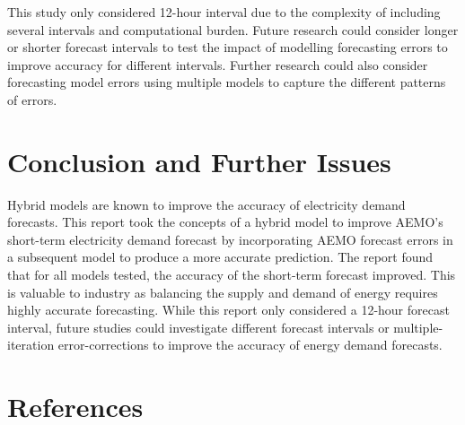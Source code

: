 \documentclass[mstat,12pt]{unswthesis}
\begin{document}
\bigskip

This study only considered 12-hour interval due to the complexity of including several intervals and computational burden. Future research could consider longer or shorter forecast intervals to test the impact of modelling forecasting errors to improve accuracy for different intervals. Further research could also consider forecasting model errors using multiple models to capture the different patterns of errors.

\chapter{Conclusion and Further Issues}\label{conclusion-and-further-issues}

Hybrid models are known to improve the accuracy of electricity demand forecasts. This report took the concepts of a hybrid model to improve AEMO's short-term electricity demand forecast by incorporating AEMO forecast errors in a subsequent model to produce a more accurate prediction. The report found that for all models tested, the accuracy of the short-term forecast improved. This is valuable to industry as balancing the supply and demand of energy requires highly accurate forecasting. While this report only considered a 12-hour forecast interval, future studies could investigate different forecast intervals or multiple-iteration error-corrections to improve the accuracy of energy demand forecasts.

\newpage

\chapter*{References}\label{references}
\end{document}

